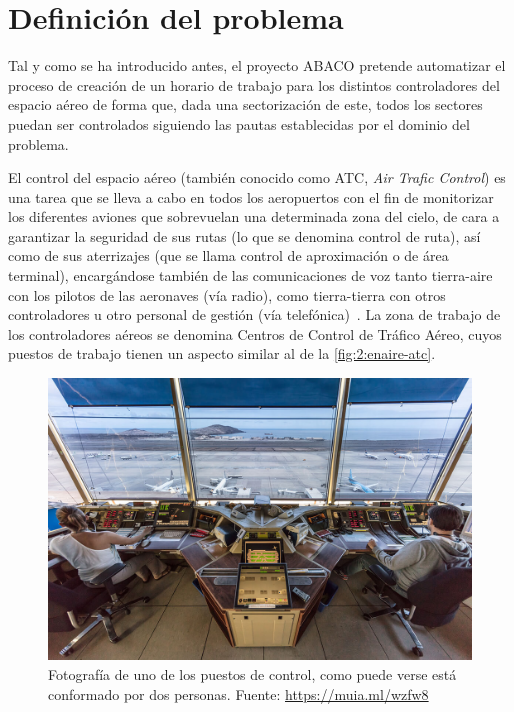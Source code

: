 \graphicspath{{capitulos/Capitulo2-Definicion-del-problema/recursos/}}

\section{Definición del problema} \label{apartado:2}

Tal y como se ha introducido antes, el proyecto ABACO pretende automatizar el proceso de creación de un horario de trabajo para
los distintos controladores del espacio aéreo de forma que, dada una sectorización de este, todos los sectores puedan ser
controlados siguiendo las pautas establecidas por el dominio del problema.

El control del espacio aéreo (también conocido como ATC, \textit{Air Trafic Control}) es una tarea que se lleva a cabo
en todos los aeropuertos con el fin de monitorizar los diferentes aviones que sobrevuelan una determinada zona del cielo,
de cara a garantizar la seguridad de sus rutas (lo que se denomina control de ruta), así como de sus aterrizajes
(que se llama control de aproximación o de área terminal), encargándose también de las comunicaciones de voz tanto
tierra-aire con los pilotos de las aeronaves (vía radio), como tierra-tierra con otros controladores u otro personal
de gestión (vía telefónica)~\cite{ENAIRE-web}.
La zona de trabajo de los controladores aéreos se denomina Centros de Control de Tráfico Aéreo, cuyos puestos de trabajo tienen
un aspecto similar al de la \autoref{fig:2:enaire-atc}.

\begin{figure}[htbp]
    \centering
    \includegraphics[width=0.7\linewidth]{ENAIRE-ATC}
    \caption{Fotografía de uno de los puestos de control, como puede verse está conformado por dos personas. Fuente: \url{https://muia.ml/wzfw8}}
    \label{fig:2:enaire-atc}
\end{figure}



